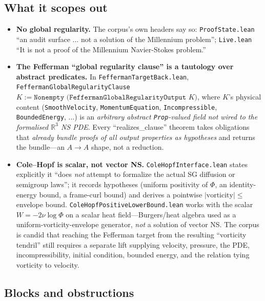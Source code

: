 \subsection{What it scopes out}
\label{sec:ns-scopes}

\begin{itemize}
  \item \textbf{No global regularity.} The corpus's own headers say so:
  \texttt{ProofState.lean} ``an audit surface $\dots$ not a solution of the
  Millennium problem''; \texttt{Live.lean} ``It is not a proof of the Millennium
  Navier-Stokes problem.''
  \item \textbf{The Fefferman ``global regularity clause'' is a tautology over
  abstract predicates.} In \texttt{FeffermanTargetBack.lean},
  \texttt{FeffermanGlobalRegularityClause }$K := \texttt{Nonempty
  (FeffermanGlobalRegularityOutput }K)$, where $K$'s physical content
  (\texttt{SmoothVelocity}, \texttt{MomentumEquation}, \texttt{Incompressible},
  \texttt{BoundedEnergy}, $\dots$) is an \emph{arbitrary abstract
  \texttt{Prop}-valued field} \emph{not wired to the formalised
  $\mathbb{R}^3$ NS PDE}. Every ``realizes\_clause'' theorem takes obligations
  that \emph{already bundle proofs of all output properties as hypotheses} and
  returns the bundle---an $A\to A$ shape, not a reduction.
  \item \textbf{Cole--Hopf is scalar, not vector NS.}
  \texttt{ColeHopfInterface.lean} states explicitly it ``does \emph{not} attempt
  to formalize the actual SG diffusion or semigroup laws''; it records
  hypotheses (uniform positivity of $\Phi$, an identity-energy bound, a
  frame-curl bound) and derives a pointwise $|\text{vorticity}|\le$ envelope
  bound. \texttt{ColeHopfPositiveLowerBound.lean} works with the scalar
  $W=-2\nu\log\Phi$ on a scalar heat field---Burgers/heat algebra used as a
  uniform-vorticity-envelope generator, \emph{not} a solution of vector NS. The
  corpus is candid that reaching the Fefferman target from the resulting
  ``vorticity tendril'' still requires a separate lift supplying velocity,
  pressure, the PDE, incompressibility, initial condition, bounded energy, and
  the relation tying vorticity to velocity.
\end{itemize}

\subsection{Blocks and obstructions}
\label{sec:ns-blocks}

